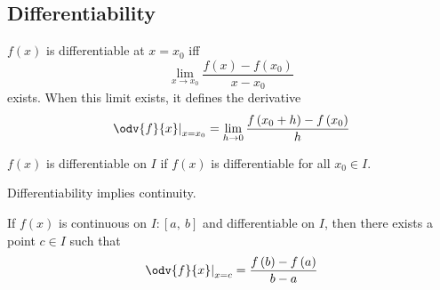 \documentclass{article}
\begin{document}
\subsection{Differentiability}
\begin{theorem}[Differentiability]
    \(f\left( x \right)\) is differentiable at \(x=x_0\) iff
    \begin{equation*}
        \lim_{x\to x_0} \frac{f\left( x \right)-f\left( x_0 \right)}{x-x_0}
    \end{equation*}
    exists. When this limit exists, it defines the derivative
    \begin{equation*}
        \left.\odv{f}{x}\right|_{x=x_0} = \lim_{h\to 0} \frac{f\left( x_0+h \right)-f\left( x_0 \right)}{h}
    \end{equation*}
\end{theorem}
\begin{theorem}
    \(f\left( x \right)\) is differentiable on \(I\) if \(f\left( x \right)\) is differentiable
    for all \(x_0\in I\).
\end{theorem}
\begin{theorem}
    Differentiability implies continuity.
\end{theorem}
\begin{theorem}
    If \(f\left( x \right)\) is continuous on \(I:\left[ a,\:b \right]\) and
    differentiable on \(I\), then there exists a point \(c\in I\) such
    that
    \begin{equation*}
        \left.\odv{f}{x}\right|_{x=c}=\frac{f\left( b \right)-f\left( a \right)}{b-a}
    \end{equation*}
\end{theorem}
\newpage
\end{document}

